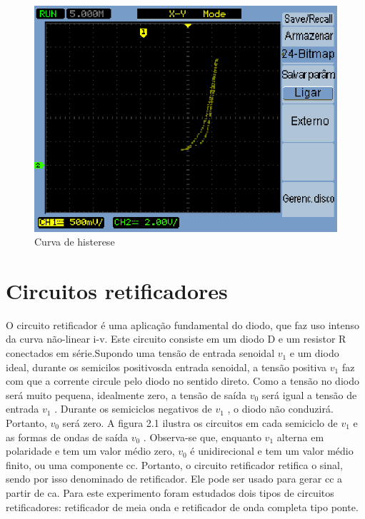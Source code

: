 \documentclass[a4paper]{article} %
\renewcommand{\thefigure}{\thesection.\arabic{figure}}
\begin{document}
\begin{figure}[h]
\begin{centering}
\includegraphics[scale=1.0]{Imagens/3.1.opcional/opcio} \caption{Curva de histerese \label{fig:q1-his}}
\par\end{centering}
\end{figure}

\renewcommand{\thefigure}{\thesubsection.\arabic{figure}}

\newpage
\section{Circuitos retificadores}
 \setcounter{figure}{0}
O circuito retificador é uma aplicação fundamental do diodo, que faz uso intenso da curva não-linear i-v. Este circuito consiste em um diodo D e um resistor R conectados em série.Supondo uma tensão de entrada senoidal  $v_1$ e um diodo ideal, durante os semicilos positivosda entrada senoidal, a tensão positiva  $v_1$     faz com que a corrente circule pelo diodo no sentido
direto. Como a tensão no diodo será muito pequena, idealmente zero, a tensão de saída  $v_0$ será igual a tensão de entrada      $v_1$     . Durante os semiciclos negativos de    $v_1$    , o diodo não conduzirá. Portanto,   $v_0$     será zero. A figura 2.1 ilustra os circuitos em cada semiciclo de   $v_1$  e as formas de ondas de saída  $v_0$      .
        Observa-se que, enquanto  $v_1$        alterna em polaridade e tem um valor médio zero,     $v_0$   é unidirecional e tem um valor médio finito, ou uma componente cc. Portanto, o circuito retificador retifica o sinal, sendo por isso denominado de retificador. Ele pode ser usado para gerar cc a partir de ca.
         Para este experimento foram estudados dois tipos de circuitos retificadores: retificador
de meia onda e retificador de onda completa tipo ponte.
      
\end{document}
